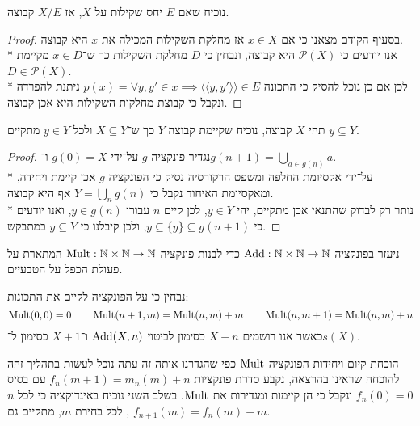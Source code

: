 \Subquestion{}
נוכיח שאם $E$ יחס שקילות על $X$, אז $X / E$ קבוצה.
\begin{proof}
	בסעיף הקודם מצאנו כי אם $x \in X$ אז מחלקת השקילות המכילה את $x$ היא קבוצה. \\*
	אנו יודעים כי $\mathcal{P}(X)$ היא קבוצה, ונבחין כי $D$ מחלקת השקילות כך ש־$x \in D$ מקיימת $D \in \mathcal{P}(X)$. \\*
	לכן אם כן נוכל להסיק כי התכונה $p(x) = \forall y, y' \in x \implies \langle \langle y, y' \rangle \rangle \in E$ ניתנת להפרדה ונקבל כי קבוצת מחלקות השקילות היא אכן קבוצה.
\end{proof}

\Question{}
תהי $X$ קבוצה, נוכיח שקיימת קבוצה $Y$ כך ש־$X \subseteq Y$ ולכל $y \in Y$ מתקיים $y \subseteq Y$.
\begin{proof}
	נגדיר פונקציה $g$ על־ידי $g(0) = X$ ו־$g(n + 1) = \bigcup_{a \in g(n)} a$. \\*
	על־ידי אקסיומת החלפה ומשפט הרקורסיה נסיק כי הפונקציה $g$ אכן קיימת ויחידה, ומאקסיומת האיחוד נקבל כי $Y = \bigcup_n g(n)$ אף היא קבוצה. \\*
	נותר רק לבדוק שהתנאי אכן מתקיים, יהי $y \in Y$, לכן קיים $n$ עבורו $y \in g(n)$, ואנו יודעים כי $y \subseteq \{ y \} \subseteq g(n + 1)$, ולכן קיבלנו כי $y \subseteq Y$ במתבקש.
\end{proof}

\Question{}
\Subquestion{}
ניעזר בפונקציה $\operatorname{Add} : \mathbb{N} \times \mathbb{N} \to \mathbb{N}$ כדי לבנות פונקציה $\operatorname{Mult} : \mathbb{N} \times \mathbb{N} \to \mathbb{N}$ המתארת על פעולת הכפל על הטבעיים.

נבחין כי על הפונקציה לקיים את התכונות:
\[
	\operatorname{Mult}(0, 0) = 0
	\qquad
	\operatorname{Mult}(n + 1, m) = \operatorname{Mult}(n, m) + m
	\qquad
	\operatorname{Mult}(n, m + 1) = \operatorname{Mult}(n, m) + n
\]
כאשר אנו רושמים $X + n$ כסימון לביטוי $\operatorname{Add}(X, n)$ ו־$X + 1$ כסימון ל־$s(X)$.

הוכחת קיום ויחידות הפונקציה $\operatorname{Mult}$ כפי שהגדרנו אותה זה עתה נוכל לעשות בתהליך זהה להוכחה שראינו בהרצאה, נקבע סדרת פונקציות $f_n(m + 1) = m_n(m) + n$ עם בסיס $f_n(0) = 0$ ונקבל כי הן קיימות ומגדירות את $\operatorname{Mult}$.
בשלב השני נוכיח באינדוקציה כי לכל $n$, לכל בחירת $m$, מתקיים גם $f_{n + 1}(m) = f_n(m) + m$.



